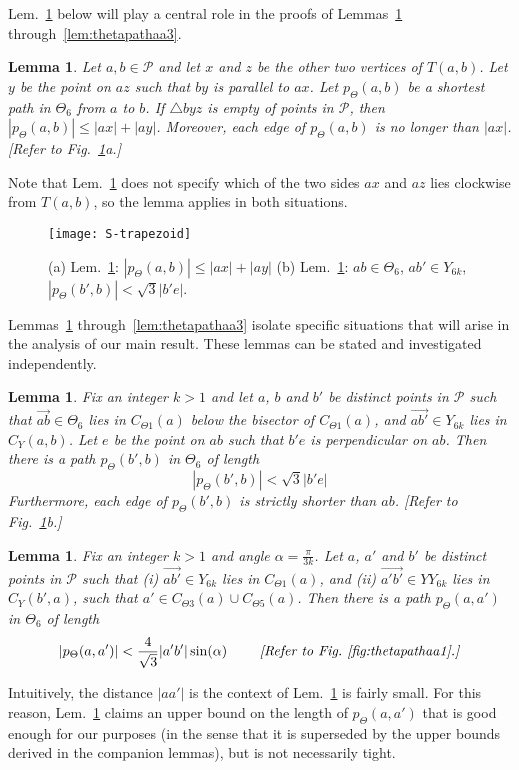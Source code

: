 \documentclass[11pt]{article}
\newcommand\cone{{C}}
\newcommand\Pt{\mathcal P}
\newcommand{\arr}[1]{\overrightarrow{#1}}
\newtheorem{lemma}[theorem]{Lemma}
\begin{document}
\noindent
Lem.~\ref{lem:thetapath} below will play a central role in the proofs of Lemmas~\ref{lem:thetapathbb} through~\ref{lem:thetapathaa3}.
\begin{lemma}
Let $a, b \in \Pt$ and let $x$ and $z$ be the other two vertices of $T(a, b)$. Let $y$ be the point on $az$ such that $by$ is parallel to $ax$. Let $p_\Theta(a, b)$ be a shortest path in $\Theta_6$ from $a$ to $b$. If $\triangle byz$ is empty of points in $\Pt$, then $|p_\Theta(a, b)| \le |ax| + |ay|$. Moreover, each edge of $p_\Theta(a, b)$ is no longer than $|ax|$. \emph{[Refer to Fig.~\ref{fig:S-trapezoid}a.]}
\label{lem:thetapath}
\end{lemma}
Note that Lem.~\ref{lem:thetapath} does not specify which of the two sides $ax$ and $az$ lies clockwise from $T(a,b)$, so the lemma applies in both situations.

\begin{figure}[htpb]
\centering
\texttt{[image: S-trapezoid]}
\caption{(a) Lem.~\ref{lem:thetapath}: $|p_\Theta(a, b)| \le |ax| + |ay|$
(b) Lem.~\ref{lem:thetapathbb}: $ab \in \Theta_6$, $ab' \in Y_{6k}$, $|p_\Theta(b',b)| < \sqrt{3}|b'e|$. }
\label{fig:S-trapezoid}
\end{figure}


\medskip
\noindent
Lemmas~\ref{lem:thetapathbb} through~\ref{lem:thetapathaa3} isolate specific situations that will arise in the analysis of our main result. These lemmas can be stated and investigated independently.

\begin{lemma}
Fix an integer $k > 1$ and let $a$, $b$ and $b'$ be distinct points in $\Pt$ such that $\arr{ab} \in \Theta_6$ lies in $\cone_{\Theta1}(a)$ below the bisector of $\cone_{\Theta1}(a)$,
and $\arr{ab'} \in Y_{6k}$ lies in $\cone_Y(a, b)$. Let $e$ be the point on $ab$ such that $b'e$ is perpendicular on $ab$. Then there is a path $p_\Theta(b', b)$ in $\Theta_6$ of length
\[
|p_\Theta(b',b)| < \sqrt{3}|b'e|
\]
Furthermore, each edge of $p_\Theta(b',b)$ is strictly shorter than $ab$. \emph{[Refer to Fig.~\ref{fig:S-trapezoid}b.]}
\label{lem:thetapathbb}
\end{lemma}

\begin{lemma}
Fix an integer $k > 1$ and angle $\alpha = \frac{\pi}{3k}$. Let $a$, $a'$ and $b'$ be distinct points in $\Pt$ such that (i) $\arr{ab'} \in Y_{6k}$ lies in $\cone_{\Theta1}(a)$,
and (ii) $\arr{a'b'} \in YY_{6k}$ lies in $\cone_Y(b', a)$, such that $a' \in \cone_{\Theta3}(a) \cup \cone_{\Theta5}(a)$. Then there is a path $p_\Theta(a, a')$ in $\Theta_6$ of length
\[
|p_\Theta(a,a')| <  \frac{4}{\sqrt{3}}|a'b'|\sin(\alpha)
\mbox{~~~~~~~\emph{[Refer to Fig.~\ref{fig:thetapathaa1}.]}}
\]
\label{lem:thetapathaa1}
\end{lemma}
\vspace{-1.5em}
Intuitively, the distance $|aa'|$ is the context of Lem.~\ref{lem:thetapathaa1} is fairly small. For this reason,
Lem.~\ref{lem:thetapathaa1} claims an upper bound on the length of $p_\Theta(a,a')$ that is good enough for our purposes (in the sense that it is superseded by the upper bounds derived in the companion lemmas), but is not necessarily tight.
\end{document}
